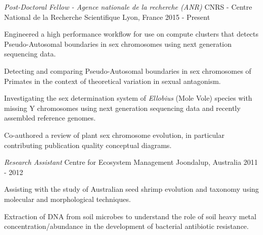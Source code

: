 

\begin{cventries}

  \cventry
    {\emph{Post-Doctoral Fellow - Agence nationale de la recherche (ANR)} } %
    {CNRS - Centre National de la Recherche Scientifique} %
    {Lyon, France} %
    {2015 - Present} %
    {
	  \begin{cvitems} %
		\item {Engineered a high performance workflow for use on compute clusters that detects Pseudo-Autosomal boundaries in sex chromosomes using next generation sequencing data.}
		\item {Detecting and comparing Pseudo-Autosomal boundaries in sex chromosomes of Primates in the context of theoretical variation in sexual antagonism.}
		\item {Investigating the sex determination system of \textit{Ellobius} (Mole Vole) species with missing Y chromosomes using next generation sequencing data and recently assembled reference genomes.}
		\item {Co-authored a review of plant sex chromosome evolution, in particular contributing publication quality conceptual diagrams.}
	  \end{cvitems}
    }


  \cventry
    {\emph{Research Assistant}} %
    {Centre for Ecosystem Management} %
    {Joondalup, Australia} %
    {2011 - 2012} %
    {
      \begin{cvitems} %
        \item {Assisting with the study of Australian seed shrimp evolution and taxonomy using molecular and morphological techniques.}
        \item {Extraction of DNA from soil microbes to understand the role of soil heavy metal concentration/abundance in the development of bacterial antibiotic resistance.}
      \end{cvitems}
    }


\end{cventries}

